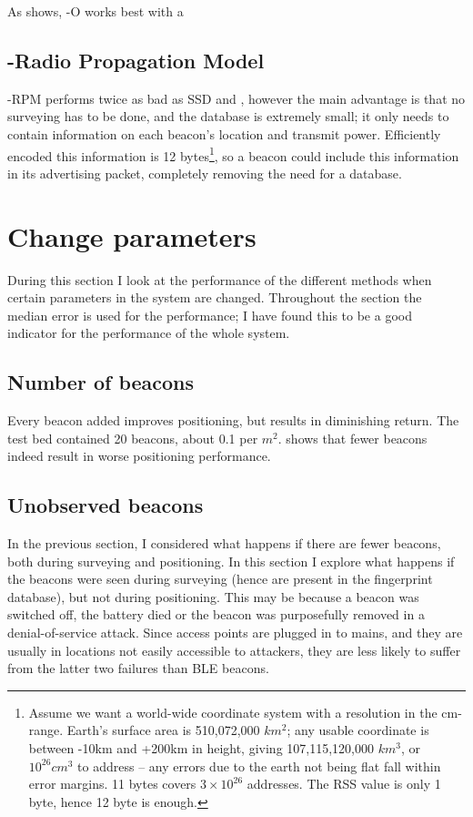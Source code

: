 As  shows, \aBRP-O works best with a 


\subsection{\BRP-Radio Propagation Model}
\aBRP-RPM performs twice as bad as SSD and \aBRP, however the main advantage is that no surveying has to be done, and the database is extremely small; it only needs to contain information on each beacon's location and transmit power.
Efficiently encoded this information is 12 bytes\footnote{
    Assume we want a world-wide coordinate system with a resolution in the cm-range.
    Earth's surface area is 510,072,000 $km^2$; any usable coordinate is between -10km and +200km in height, giving 107,115,120,000 $km^3$, or $10^{26} cm^3$ to address -- any errors due to the earth not being flat fall within error margins.
    11 bytes covers $3\times 10^{26}$ addresses.
    The RSS value is only 1 byte, hence 12 byte is enough.
}, so a beacon could include this information in its advertising packet, completely removing the need for a database.



\section{Change parameters}
During this section I look at the performance of the different methods when certain parameters in the system are changed.
Throughout the section the median error is used for the performance; I have found this to be a good indicator for the performance of the whole system.

\subsection{Number of beacons}
Every beacon added improves positioning, but results in diminishing return.
The test bed contained 20 beacons, about 0.1 per $m^2$.
 shows that fewer beacons indeed result in worse positioning performance.


\subsection{Unobserved beacons}
\label{sec:architecture-dying-beacons}
In the previous section, I considered what happens if there are fewer beacons, both during surveying and positioning.
In this section I explore what happens if the beacons were seen during surveying (hence are present in the fingerprint database), but not during positioning.
This may be because a beacon was switched off, the battery died or the beacon was purposefully removed in a denial-of-service attack.
Since \wifi access points are plugged in to mains, and they are usually in locations not easily accessible to attackers, they are less likely to suffer from the latter two failures than BLE beacons.

